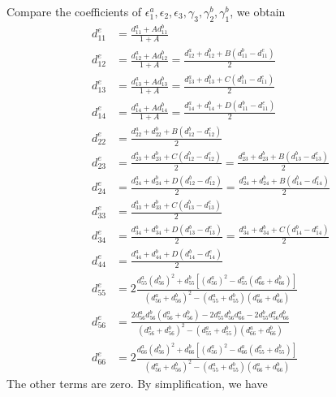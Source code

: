 \documentclass{article}
\begin{document}
Compare the coefficients of $\epsilon_1^a, \epsilon_2, \epsilon_3, \gamma_3, \gamma_2^b, \gamma_1^b$, we obtain
\begin{subequations}
\begin{align}
d_{11}^e & = \frac{d_{11}^a+Ad_{11}^b}{1+A} \\
d_{12}^e & = \frac{d_{12}^a+Ad_{12}^b}{1+A} = \frac{d_{12}^a+d_{12}^b+B(d_{11}^b-d_{11}^e)}{2}\\
d_{13}^e & = \frac{d_{13}^a+Ad_{13}^b}{1+A} = \frac{d_{13}^a+d_{13}^b+C(d_{11}^b-d_{11}^e)}{2}\\
d_{14}^e & = \frac{d_{14}^a+Ad_{14}^b}{1+A} = \frac{d_{14}^a+d_{14}^b+D(d_{11}^b-d_{11}^e)}{2}\\
d_{22}^e & = \frac{d_{22}^a+d_{22}^b+B(d_{12}^b-d_{12}^e)}{2}\\
d_{23}^e & = \frac{d_{23}^a+d_{23}^b+C(d_{12}^b-d_{12}^e)}{2} = 
\frac{d_{23}^a+d_{23}^b+B(d_{13}^b-d_{13}^e)}{2} \\
d_{24}^e & = \frac{d_{24}^a+d_{24}^b+D(d_{12}^b-d_{12}^e)}{2} = 
\frac{d_{24}^a+d_{24}^b+B(d_{14}^b-d_{14}^e)}{2} \\
d_{33}^e & = \frac{d_{33}^a+d_{33}^b+C(d_{13}^b-d_{13}^e)}{2}\\
d_{34}^e & = \frac{d_{34}^a+d_{34}^b+D(d_{13}^b-d_{13}^e)}{2} = 
\frac{d_{34}^a+d_{34}^b+C(d_{14}^b-d_{14}^e)}{2} \\
d_{44}^e & = \frac{d_{44}^a+d_{44}^b+D(d_{14}^b-d_{14}^e)}{2}\\
d_{55}^e & = 2\frac{d_{55}^a (d_{56}^b)^2+d_{55}^b[(d_{56}^a)^2-d_{55}^a(d_{66}^a+d_{66}^b)]}{(d_{56}^a+d_{56}^b)^2-(d_{55}^a+d_{55}^b)(d_{66}^a+d_{66}^b)} \\
d_{56}^e & = \frac{2d_{56}^a d_{56}^b(d_{56}^a+d_{56}^b)-2d_{55}^a d_{56}^b d_{66}^a-2d_{55}^b d_{56}^a d_{66}^b }{(d_{56}^a+d_{56}^b)^2-(d_{55}^a+d_{55}^b)(d_{66}^a+d_{66}^b)} \\
d_{66}^e & = 2\frac{d_{66}^a (d_{56}^b)^2+d_{66}^b[(d_{56}^a)^2-d_{66}^a(d_{55}^a+d_{55}^b)]}{(d_{56}^a+d_{56}^b)^2-(d_{55}^a+d_{55}^b)(d_{66}^a+d_{66}^b)}
\end{align}
\end{subequations}
The other terms are zero. By simplification, we have
\end{document}
